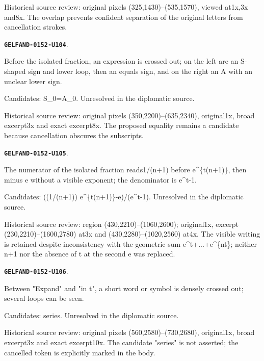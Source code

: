 \documentclass[11pt]{article}
\theoremstyle{definition}
\theoremstyle{remark}
\begin{document}
Historical source review: original pixels (325,1430)–(535,1570), viewed at1x,3x and8x. The overlap prevents confident separation of the original letters from cancellation strokes.\par\medskip
\par\noindent\leavevmode{}\label{GELFAND-0152-U104}\label{GELFAND-P001395:exponential-cancellation:note}\textbf{\texttt{GELFAND-0152-U104}}.\nopagebreak[4]\par
Before the isolated fraction, an expression is crossed out; on the left are an S-shaped sign and lower loop, then an equals sign, and on the right an A with an unclear lower sign.\par
Candidates: S\_0=A\_0. Unresolved in the diplomatic source.\par
Historical source review: original pixels (350,2200)–(635,2340), original1x, broad excerpt3x and exact excerpt8x. The proposed equality remains a candidate because cancellation obscures the subscripts.\par\medskip
\par\noindent\leavevmode{}\label{GELFAND-0152-U105}\label{GELFAND-P001395:exponential-fraction:note}\textbf{\texttt{GELFAND-0152-U105}}.\nopagebreak[4]\par
The numerator of the isolated fraction reads1/(n+1) before e\textasciicircum{}\{t(n+1)\}, then minus e without a visible exponent; the denominator is e\textasciicircum{}t-1.\par
Candidates: ((1/(n+1)) e\textasciicircum{}\{t(n+1)\}-e)/(e\textasciicircum{}t-1). Unresolved in the diplomatic source.\par
Historical source review: region (430,2210)–(1060,2600); original1x, excerpt (230,2210)–(1600,2780) at3x and (430,2280)–(1020,2560) at4x. The visible writing is retained despite inconsistency with the geometric sum e\textasciicircum{}t+...+e\textasciicircum{}\{nt\}; neither n+1 nor the absence of t at the second e was replaced.\par\medskip
\par\noindent\leavevmode{}\label{GELFAND-0152-U106}\label{GELFAND-P001395:series-cancellation:note}\textbf{\texttt{GELFAND-0152-U106}}.\nopagebreak[4]\par
Between "Expand" and "in t", a short word or symbol is densely crossed out; several loops can be seen.\par
Candidates: series. Unresolved in the diplomatic source.\par
Historical source review: original pixels (560,2580)–(730,2680), original1x, broad excerpt3x and exact excerpt10x. The candidate "series" is not asserted; the cancelled token is explicitly marked in the body.\par\medskip
\end{document}
